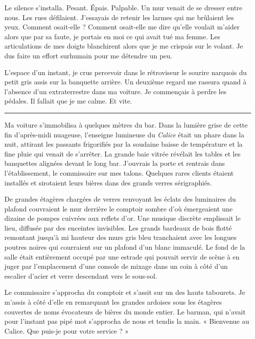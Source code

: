 Le silence s'installa. Pesant. Épais. Palpable. Un mur venait de se dresser entre nous. Les rues défilaient. J'essayais 
de retenir les larmes qui me brûlaient les yeux. Comment osait-elle ? Comment osait-elle me dire qu'elle voulait m'aider 
alors que par sa faute, je portais en moi ce qui avait tué ma femme. Les articulations de mes doigts blanchirent alors 
que je me crispais sur le volant. Je dus faire un effort surhumain pour me détendre un peu.

L'espace d'un instant, je crus percevoir dans le rétroviseur le sourire narquois du petit gris assis sur la banquette 
arrière. Un deuxième regard me rassura quand à l'absence d'un extraterrestre dans ma voiture. Je commençais à perdre 
les pédales. Il fallait que je me calme. Et vite.

\fancybreak{***}

Ma voiture s'immobilisa à quelques mètres du bar. Dans la lumière grise de cette fin d'après-midi nuageuse, l'enseigne 
lumineuse du \emph{Calice} était un phare dans la nuit, attirant les passants frigorifiés par la soudaine baisse de 
température et la fine pluie qui venait de s'arrêter. La grande baie vitrée révélait les tables et les banquettes 
alignées devant le long bar. J'ouvrais la porte et rentrais dans l'établissement, le commissaire sur mes talons. 
Quelques rares clients étaient installés et sirotaient leurs bières dans des grands verres sérigraphiés.

De grandes étagères chargées de verres renvoyant les éclats des luminaires du plafond couvraient le mur derrière le 
comptoir sombre d'où émergeaient une dizaine de pompes cuivrées aux reflets d'or. Une musique discrète emplissait le 
lieu, diffusée par des enceintes invisibles. Les grands bardeaux de bois flotté remontant jusqu'à mi hauteur des murs 
gris bleu tranchaient avec les longues poutres noires qui courraient sur un plafond d'un blanc immaculé. Le fond de la 
salle était entièrement occupé par une estrade qui pouvait servir de scène à en juger par l'emplacement d'une console 
de mixage dans un coin à côté d'un escalier d'acier et verre descendant vers le sous-sol.

Le commissaire s'approcha du comptoir et s'assit sur un des hauts tabourets. Je m'assis à côté d'elle en remarquant 
les grandes ardoises sous les étagères couvertes de noms évocateurs de bières du monde entier. Le barman, qui 
n'avait pour l'instant pas pipé mot s'approcha de nous et tendis la main. « Bienvenue au Calice. Que puis-je pour votre 
service ? »

